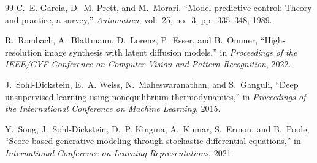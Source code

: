 \documentclass[12pt,a4paper]{article}
\theoremstyle{plain}
\theoremstyle{definition}
\theoremstyle{remark}
\begin{document}
\begin{thebibliography}{99}
C.~E. Garcia, D.~M. Prett, and M.~Morari, ``Model predictive control: Theory and practice, a survey,'' \textit{Automatica}, vol.~25, no.~3, pp.~335--348, 1989.

R.~Rombach, A.~Blattmann, D.~Lorenz, P.~Esser, and B.~Ommer, ``High-resolution image synthesis with latent diffusion models,'' in \textit{Proceedings of the IEEE/CVF Conference on Computer Vision and Pattern Recognition}, 2022.

J.~Sohl-Dickstein, E.~A. Weiss, N.~Maheswaranathan, and S.~Ganguli, ``Deep unsupervised learning using nonequilibrium thermodynamics,'' in \textit{Proceedings of the International Conference on Machine Learning}, 2015.

Y.~Song, J.~Sohl-Dickstein, D.~P. Kingma, A.~Kumar, S.~Ermon, and B.~Poole, ``Score-based generative modeling through stochastic differential equations,'' in \textit{International Conference on Learning Representations}, 2021.

\end{thebibliography}
\end{document}

